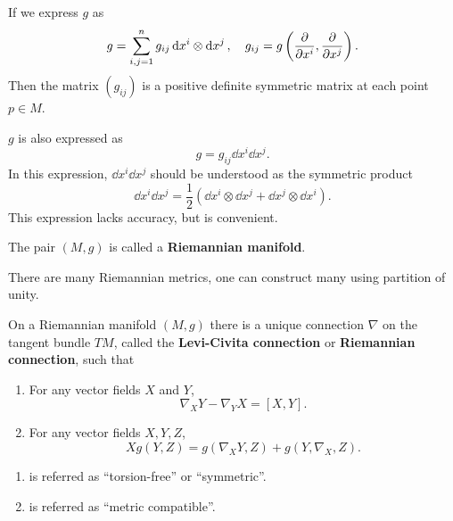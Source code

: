 \documentclass[12pt]{article}
\begin{document}
If we express \(g\) as \[
    g=\sum_{i,j=1}^{n}g_{ij}\dd{x^i}\otimes \dd{x^j},\quad
    g_{ij}=g\left(\pdv{x^i},\pdv{x^j}\right)
.\] Then the matrix \((g_{ij})\) is a positive definite symmetric matrix at each point
\(p\in M\).

\(g\) is  also expressed as \[
    g=g_{ij}\dd{x^i}\dd{x^j}
.\] In this expression, \(\dd{x^i}\dd{x^j}\) should be understood as the symmetric
product \[
    \dd{x^i}\dd{x^j}=\frac{1}{2}(\dd{x^i}\otimes \dd{x^j}+\dd{x^j}\otimes \dd{x^i})
.\] This expression lacks accuracy, but is convenient.

\begin{definition}
    The pair \((M,g)\) is called a \textbf{Riemannian manifold}.
\end{definition}
There are many Riemannian metrics, one can construct many using partition of unity.

\begin{theorem}
    On a Riemannian manifold \((M,g)\) there is a unique connection \(\nabla\) on
    the tangent bundle \(TM\), called the \textbf{Levi-Civita connection} or \textbf{
    Riemannian connection}, such that
    \begin{enumerate}[(1)]
    \item For any vector fields \(X\) and \(Y\), \[
        \nabla_X Y-\nabla_Y X=[X,Y]
    .\] 
    \item For any vector fields \(X,Y,Z\), \[
        Xg(Y,Z)=g(\nabla_X Y,Z)+g(Y,\nabla_X,Z)
    .\] 
    \end{enumerate}
\end{theorem}
\begin{remark}\hfill
\begin{enumerate}[(1)]
    \item is referred as ``torsion-free'' or ``symmetric''.
    \item is referred as ``metric compatible''.
\end{enumerate}
\end{remark}
\end{document}
